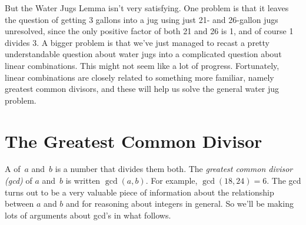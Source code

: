 But the Water Jugs Lemma isn't very satisfying.  One problem is that
it leaves the question of getting 3 gallons into a jug using just 21-
and 26-gallon jugs unresolved, since the only positive factor of both
21 and 26 is 1, and of course 1 divides 3.  A bigger problem is that
we've just managed to recast a pretty understandable question about
water jugs into a complicated question about linear combinations.
This might not seem like a lot of progress.  Fortunately, linear
combinations are closely related to something more familiar, namely
greatest common divisors, and these will help us solve the general
water jug problem.

\begin{problems}
\practiceproblems
{}

\classproblems
{}

\end{problems}

\section{The Greatest Common Divisor}
\label{sec:gcd}

A  of~$a$ and~$b$ is a number that divides them
both.  The \emph{greatest common divisor (gcd)} of $a$ and~$b$ is
written $\gcd(a, b)$.  For example, $\gcd(18, 24) = 6$.  The gcd turns
out to be a very valuable piece of information about the relationship
between $a$ and $b$ and for reasoning about integers in general.  So
we'll be making lots of arguments about gcd's in what follows.




